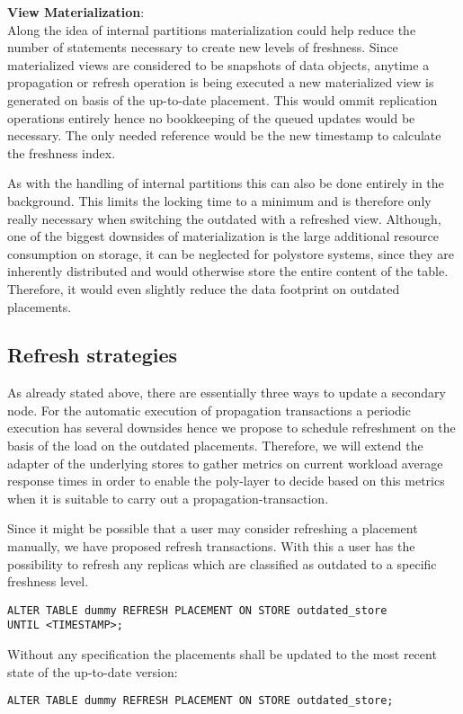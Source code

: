 \textbf{View Materialization}:\\
Along the idea of internal partitions materialization could help reduce the number of statements necessary to create new levels of freshness.
Since materialized views are considered to be snapshots of data objects, anytime a propagation or refresh operation is being executed a new materialized view is 
generated on basis of the up-to-date placement.
This would ommit replication operations entirely hence no bookkeeping of the queued updates would be necessary. The only needed reference would be the new timestamp
to calculate the freshness index.

As with the handling of internal partitions this can also be done entirely in the background. This limits the locking time to a minimum and is therefore only really 
necessary when switching the outdated with a refreshed view.
Although, one of the biggest downsides of materialization is the large additional resource consumption on storage, it can be neglected for polystore systems, since they are
inherently distributed and would otherwise store the entire content of the table. Therefore, it would even slightly reduce the data footprint on outdated placements.







\subsection{Refresh strategies}
As already stated above, there are essentially three ways to update a secondary node. 
For the automatic execution of propagation transactions a periodic execution has several downsides hence we propose to schedule
refreshment on the basis of the load on the outdated placements. Therefore, we will extend the adapter of the underlying stores to gather metrics on current workload
average response times in order to enable the poly-layer to decide based on this metrics when it is suitable to carry out a propagation-transaction.


Since it might be possible that a user may consider refreshing a placement manually, we have proposed refresh transactions. With this a user has the possibility to refresh
any replicas which are classified as outdated to a specific freshness level.
\begin{verbatim}
ALTER TABLE dummy REFRESH PLACEMENT ON STORE outdated_store 
UNTIL <TIMESTAMP>;
\end{verbatim}
Without any specification the placements shall be updated to the most recent state of the up-to-date version:
\begin{verbatim}
ALTER TABLE dummy REFRESH PLACEMENT ON STORE outdated_store;
\end{verbatim}

